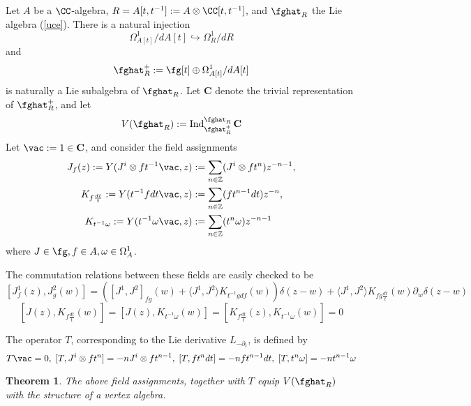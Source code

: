 \documentclass[12pt]{amsart}
\newtheorem{theorem}{Theorem}[section]
\theoremstyle{definition}
\theoremstyle{remark}
\newcommand{\on}{\operatorname}
\newcommand{\R}{R}
\begin{document}
Let $A$ be a $\CC$-algebra, $\R=A[t,t^{-1}] := A \otimes \CC[t,t^{-1}]$, and $\fghat_{\R}$ the Lie algebra (\ref{uce}). 
There is a natural injection
\[
\Omega^1_{A[t]}/ d A[t] \hookrightarrow \Omega^{1}_{\R} / d \R
\]
and 
$$\fghat^{+}_{\R} := \fg[t] \oplus \Omega^1_{A[t]}/ d A[t]  $$ is naturally a Lie subalgebra of $\fghat_{\R}$. Let $\mathbf{C}$ denote the trivial representation of $\fghat^{+}_{\R}$, and let
\begin{equation}
V(\fghat_{\R}) := \on{Ind}^{\fghat_{\R}}_{\fghat^+_{\R}} \mathbf{C}
\end{equation}
Let $\vac := 1 \in \mathbf{C}$, and consider the field assignments
\begin{align}
J_f(z) := Y(J^{i} \otimes f t^{-1} \vac,z ) & := \sum_{n \in \mathbb{Z}} (J^i  \otimes f t^{n}) z^{-n-1}, \\
K_{f \frac{dt}{t}} :=  Y(t^{-1} f dt \vac,z ) & := \sum_{n \in \mathbb{Z}} ( f t^{n-1} dt )  z^{-n}, \\
K_{t^{-1} \omega} := Y(t^{-1}  \omega \vac,z ) & := \sum_{n \in \mathbb{Z}}( t^{n} \omega )    z^{-n-1} \\
\end{align}
where $J\in \fg, f \in A, \omega \in \Omega^{1}_A$. 

The commutation relations between these fields are easily checked to be
$$
[J^1_f (z), J^2_g (w)] = \left( [J^1, J^2]_{fg} (w) + \langle J^1, J^2 \rangle  K_{t^{-1} g df} (w)      \right) \delta(z-w) + \langle J^1, J^2 \rangle K_{fg \frac{dt}{t}} (w) \partial_w \delta(z-w)
$$
$$
[J(z), K_{f \frac{dt}{t}}(w) ] = [J(z), K_{t^{-1} \omega} (w)] = [ K_{f \frac{dt}{t}}(z),  K_{t^{-1} \omega} (w)] =0
$$

The operator $T$, corresponding to the Lie derivative $L_{-\partial_t}$, is defined by
\[
T \vac =0, \; [T, J^i \otimes f t^n] = -n J^i \otimes f t^{n-1}, \; [T, f t^n dt] = -n f t^{n-1} dt, \; [T, t^n \omega] = -n t^{n-1} \omega
\]

\begin{theorem}
The above field assignments, together with $T$ equip $V(\fghat_{\R})$ with the structure of a vertex algebra.
\end{theorem}
\end{document}
